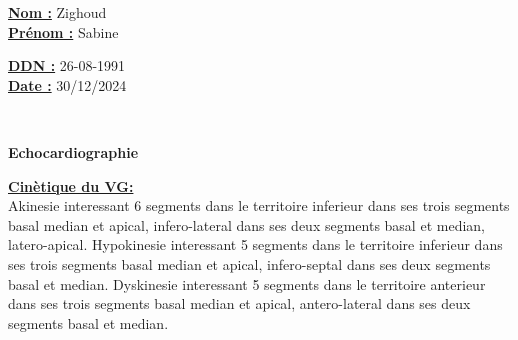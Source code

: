 \documentclass[12pt,a4paper]{article}%
\begin{document}
%
\normalsize%
\begin{minipage}{0.5\linewidth}%
\textbf{\underline{Nom :}} \hspace{1cm} Zighoud%
\\%
\textbf{\underline{Prénom :}} \hspace{1cm} Sabine%
\\%
\end{minipage}%
\begin{minipage}{0.5\linewidth}%
\textbf{\underline{DDN :}} \hspace{1cm} 26-08-1991%
\\%
\textbf{\underline{Date :}} \hspace{1cm} 30/12/2024%
\\%
\end{minipage}%
\hspace{\textwidth}%
\\%
\begin{center}%

            \begin{tcolorbox}[
                colframe=blue,        %
                colback=white,        %
                coltitle=black,       %
                arc=8pt,              %
                boxrule=1mm,          %
                width=0.8\textwidth,  %
                auto outer arc,       %
                width=\linewidth,     %
                halign=center         %
            ]
            \LARGE{\textbf{Echocardiographie}}
            \end{tcolorbox}
\end{center}%
%
\vspace*{\baselineskip}%
\textbf{\ul{Cinètique du VG:}}%
\\%
Akinesie interessant 6 segments dans le territoire inferieur dans ses trois segments basal median et apical, infero{-}lateral dans ses deux segments basal et median, latero{-}apical. Hypokinesie interessant 5 segments dans le territoire inferieur dans ses trois segments basal median et apical, infero{-}septal dans ses deux segments basal et median. Dyskinesie interessant 5 segments dans le territoire anterieur dans ses trois segments basal median et apical, antero{-}lateral dans ses deux segments basal et median.%
\\%
\\%
\end{document}
